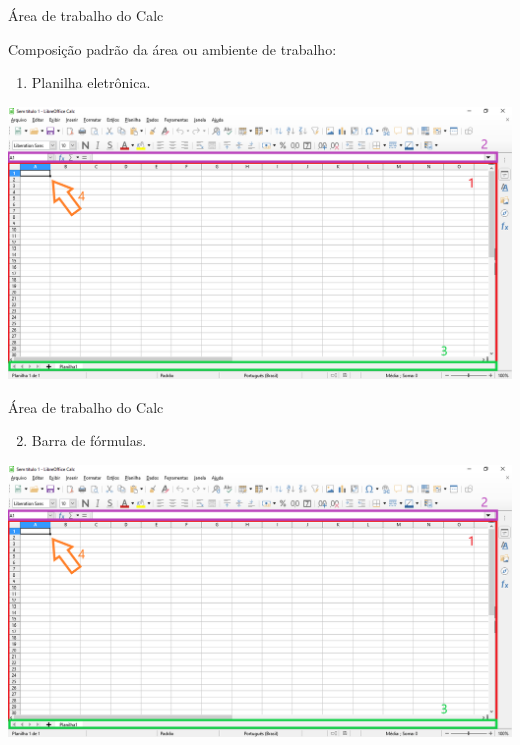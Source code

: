 \begin{frame}{Área de trabalho do Calc}
	\begin{block}{}
		Composição padrão da área ou ambiente de trabalho:
		\begin{enumerate}
			\item Planilha eletrônica.
		\end{enumerate}
	\end{block}
	
	\centering
	\includegraphics[width=0.9\linewidth]{Figuras/Ch06/fig2}
\end{frame}


\begin{frame}{Área de trabalho do Calc}
	\begin{block}{}
		\begin{enumerate}
			\setcounter{enumi}{1}
			\item Barra de fórmulas.
		\end{enumerate}
	\end{block}
	
	\centering
	\includegraphics[width=0.95\linewidth]{Figuras/Ch06/fig2}
\end{frame}


